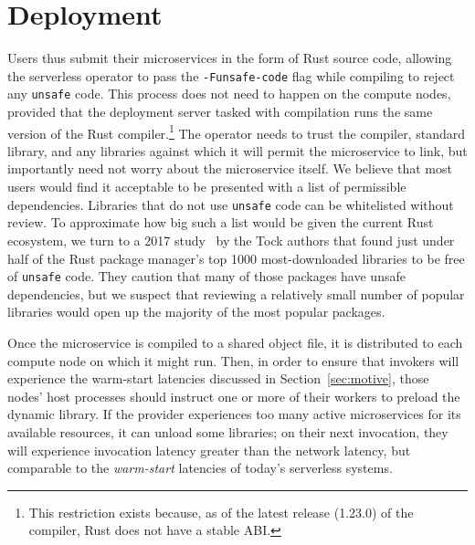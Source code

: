 \section{Deployment}
\label{sec:deploy}

Users thus submit their microservices in the form of Rust source code, allowing the
serverless operator to pass the \texttt{-Funsafe-code} flag while compiling to reject
any \texttt{unsafe} code.  This process does not need to happen on the compute
nodes, provided that the deployment server tasked with compilation runs the same version
of the Rust compiler.\footnote{This restriction exists because, as of the latest
release (1.23.0) of the compiler, Rust does not have a stable ABI.}  The operator
needs to trust the compiler, standard library, and any libraries against which it
will permit the microservice to link, but importantly need not worry about the
microservice itself.  We believe that most users would find it acceptable to be
presented with a list of permissible dependencies.  Libraries that do not use
\texttt{unsafe} code can be whitelisted without review.  To approximate how big
such a list would be given the current Rust ecosystem, we turn to a 2017
study~\cite{www-cratesio-unsafe} by the Tock authors that found just under half of
the Rust package manager's top 1000 most-downloaded libraries to be free of
\texttt{unsafe} code.  They caution that many of those packages have unsafe
dependencies, but we suspect that reviewing a relatively small number of popular
libraries would open up the majority of the most popular packages.

Once the microservice is compiled to a shared object file, it is distributed to
each compute node on which it might run.  Then, in order to ensure that invokers will
experience the warm-start latencies discussed in Section~\ref{sec:motive}, those
nodes' host processes should instruct one or more of their workers to preload the
dynamic library.  If the provider experiences too many active
microservices for its available resources, it can unload some libraries; on their
next invocation, they will experience invocation latency greater than the network
latency, but comparable to the \textit{warm-start} latencies of today's serverless
systems.
